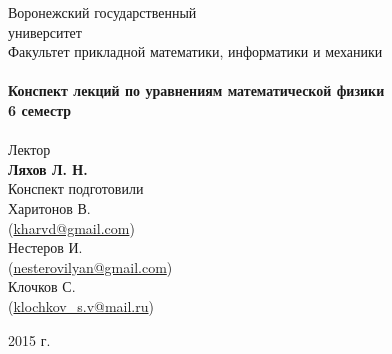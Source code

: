 \begin{titlepage}
\begin{center}

{\LARGE Воронежский государственный\\[0.2cm]университет}\\[0.5cm]
{\large Факультет прикладной математики, информатики и механики}\\[1.5cm]

\HRule \\[0.4cm]
{ \huge \bfseries Конспект лекций по уравнениям математической физики \\[0.4cm] }
{ \Large \bfseries 6 семестр \\[0.4cm]}
\HRule \\[3cm]

{\large Лектор}\\[0.2cm]
{\Large \bfseries Ляхов Л. Н.}\\[2cm]

{Конспект подготовили}\\[0.2cm]
{Харитонов В. \\ (\href{mailto:kharvd@gmail.com}{kharvd@gmail.com})} \\
{Нестеров И. \\ (\href{mailto:nesterovilyan@gmail.com}{nesterovilyan@gmail.com})} \\
{Клочков С. \\ (\href{mailto:klochkov\_s.v@mail.ru}{klochkov\_s.v@mail.ru})}
\vfill

{\large 2015 г.}

\end{center}
\end{titlepage}

